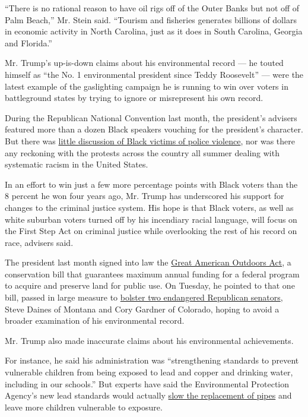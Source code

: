 ``There is no rational reason to have oil rigs off of the Outer Banks
but not off of Palm Beach,'' Mr. Stein said. ``Tourism and fisheries
generates billions of dollars in economic activity in North Carolina,
just as it does in South Carolina, Georgia and Florida.''

Mr. Trump's up-is-down claims about his environmental record --- he
touted himself as ``the No. 1 environmental president since Teddy
Roosevelt'' --- were the latest example of the gaslighting campaign he
is running to win over voters in battleground states by trying to ignore
or misrepresent his own record.

During the Republican National Convention last month, the president's
advisers featured more than a dozen Black speakers vouching for the
president's character. But there was
\href{https://www.nytimes3xbfgragh.onion/2020/08/29/us/politics/rnc-trump-race-gender.html}{little
discussion of Black victims of police violence}, nor was there any
reckoning with the protests across the country all summer dealing with
systematic racism in the United States.

In an effort to win just a few more percentage points with Black voters
than the 8 percent he won four years ago, Mr. Trump has underscored his
support for changes to the criminal justice system. His hope is that
Black voters, as well as white suburban voters turned off by his
incendiary racial language, will focus on the First Step Act on criminal
justice while overlooking the rest of his record on race, advisers said.

The president last month signed into law the
\href{https://www.nytimes3xbfgragh.onion/2020/06/17/us/senate-national-parks-funding-bill.html}{Great
American Outdoors Act}, a conservation bill that guarantees maximum
annual funding for a federal program to acquire and preserve land for
public use. On Tuesday, he pointed to that one bill, passed in large
measure to
\href{https://www.nytimes3xbfgragh.onion/2020/06/08/us/politics/senate-public-lands.html}{bolster
two endangered Republican senators}, Steve Daines of Montana and Cory
Gardner of Colorado, hoping to avoid a broader examination of his
environmental record.

Mr. Trump also made inaccurate claims about his environmental
achievements.

For instance, he said his administration was ``strengthening standards
to prevent vulnerable children from being exposed to lead and copper and
drinking water, including in our schools.'' But experts have said the
Environmental Protection Agency's new lead standards would actually
\href{https://www.nytimes3xbfgragh.onion/2019/10/10/climate/epa-lead-water-pipes.html}{slow
the replacement of pipes} and leave more children vulnerable to
exposure.

